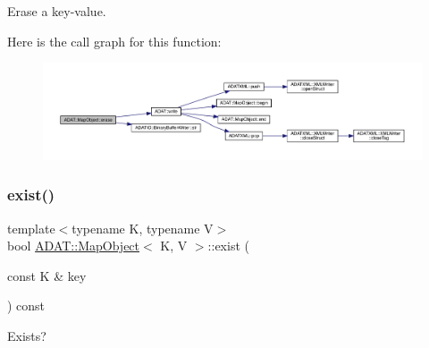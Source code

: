 Erase a key-\/value. 

Here is the call graph for this function\+:
\nopagebreak
\begin{figure}[H]
\begin{center}
\leavevmode
\includegraphics[width=350pt]{da/d29/classADAT_1_1MapObject_aa93bbf650a37c70e91904c9e7566eb6f_cgraph}
\end{center}
\end{figure}
\mbox{\label{classADAT_1_1MapObject_a1d22f979e34bda97c3dc89d5fc937d3b}} 
\subsubsection{\texorpdfstring{exist()}{exist()}\hspace{0.1cm}{\footnotesize\ttfamily [1/3]}}
{\footnotesize\ttfamily template$<$typename K, typename V$>$ \\
bool \mbox{\hyperlink{classADAT_1_1MapObject}{A\+D\+A\+T\+::\+Map\+Object}}$<$ K, V $>$\+::exist (\begin{DoxyParamCaption}\item[{const K \&}]{key }\end{DoxyParamCaption}) const\hspace{0.3cm}{\ttfamily [inline]}}



Exists? 

